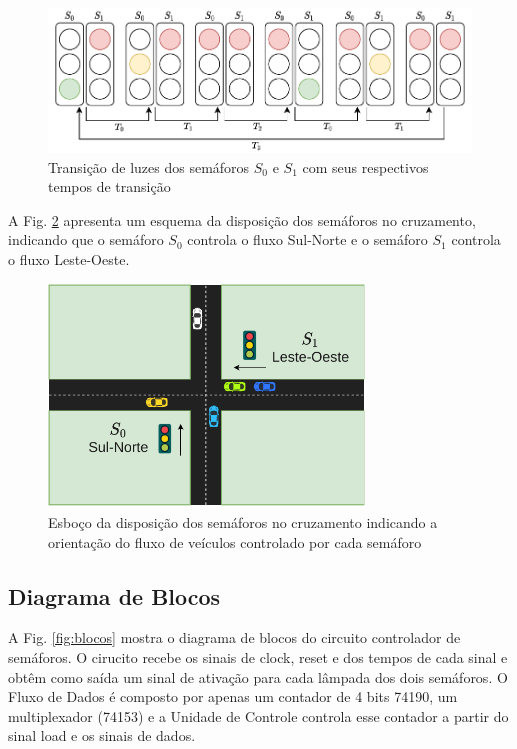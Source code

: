 \documentclass[a4,12pt]{horizon-theme}
\begin{document}
\begin{figure}[!ht]
    \centering
    \includegraphics[width=\textwidth]{luzes.pdf}
    \caption{Transição de luzes dos semáforos $S_0$ e $S_1$ com seus respectivos tempos de transição}
    \label{fig:semaforos}
\end{figure}

\newpage
A Fig. \ref{fig:cruzamento} apresenta um esquema da disposição dos semáforos no cruzamento, indicando que o semáforo $S_0$ controla o fluxo Sul-Norte e o semáforo $S_1$ controla o fluxo Leste-Oeste.

\begin{figure}[!ht]
    \centering
    \includegraphics[width=0.75\textwidth]{cruzamento.pdf}
    \caption{Esboço da disposição dos semáforos no cruzamento indicando a orientação do fluxo de veículos controlado por cada semáforo}
    \label{fig:cruzamento}
\end{figure}



\subsection{Diagrama de Blocos}

A Fig. \ref{fig:blocos} mostra o diagrama de blocos do circuito controlador de semáforos. O cirucito recebe os sinais  de clock, reset e dos tempos de cada sinal e obtêm como saída um sinal de ativação para cada lâmpada dos dois semáforos. O Fluxo de Dados é composto por apenas um contador de 4 bits 74190, um multiplexador (74153) e a Unidade de Controle controla esse contador a partir do sinal load e os sinais de dados.
\end{document}
